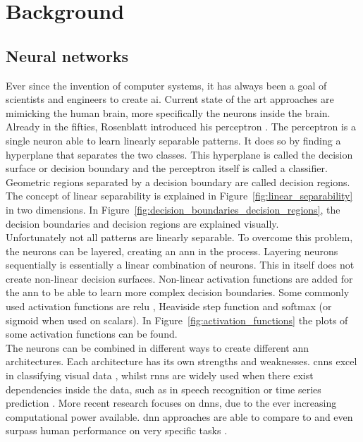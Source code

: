 \chapter{Background}
\section{Neural networks}
Ever since the invention of computer systems, it has always been a goal of scientists and engineers to create \gls{ai}. Current state of the art approaches are mimicking the human brain, more specifically the neurons inside the brain. Already in the fifties, Rosenblatt introduced his perceptron \cite{rosenblatt_perceptron_1958}. The perceptron is a single neuron able to learn linearly separable patterns. It does so by finding a hyperplane that separates the two classes. This hyperplane is called the decision surface or decision boundary and the perceptron itself is called a classifier. Geometric regions separated by a decision boundary are called decision regions. The concept of linear separability is explained in Figure~\ref{fig:linear_separability} in two dimensions. In Figure~\ref{fig:decision_boundaries_decision_regions}, the decision boundaries and decision regions are explained visually. \\

Unfortunately not all patterns are linearly separable. To overcome this problem, the neurons can be layered, creating an \gls{ann} in the process. Layering neurons sequentially is essentially a linear combination of neurons. This in itself does not create non-linear decision surfaces. Non-linear activation functions are added for the \gls{ann} to be able to learn more complex decision boundaries. Some commonly used activation functions are \gls{relu} \cite{relu}, Heaviside step function and softmax (or sigmoid when used on scalars). In Figure~\ref{fig:activation_functions} the plots of some activation functions can be found.\\ 

The neurons can be combined in different ways to create different \gls{ann} architectures. Each architecture has its own strengths and weaknesses. \glspl{cnn} excel in classifying visual data \cite{cnn_1, cnn_2}, whilst \glspl{rnn} are widely used when there exist dependencies inside the data, such as in speech recognition \cite{speech_1, speech_2} or time series prediction \cite{time_series_1}. More recent research focuses on \glspl{dnn}, due to the ever increasing computational power available. \gls{dnn} approaches are able to compare to and even surpass human performance on very specific tasks \cite{alpha_go_google, imagenet_dnn}.\\ 

